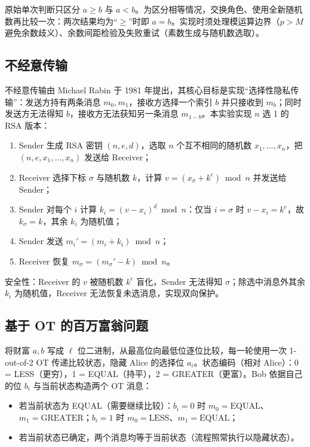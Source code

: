 \documentclass{SYSUReport}
\begin{document}
原始单次判断只区分 $a \ge b$ 与 $a < b$。为区分相等情况，交换角色、使用全新随机数再比较一次：两次结果均为“$\ge$”时即 $a = b$。实现时须处理模运算边界（$p > M$ 避免余数歧义）、余数间距检验及失败重试（素数生成与随机数选取）。

\subsection{不经意传输}

不经意传输由 Michael Rabin 于 1981 年提出，其核心目标是实现“选择性隐私传输”：发送方持有两条消息 $m_0, m_1$，接收方选择一个索引 $b$ 并只接收到 $m_b$；同时发送方无法得知 $b$，接收方无法获知另一条消息 $m_{1-b}$。本实验实现 $n$ 选 1 的 RSA 版本：

\begin{enumerate}
    \item Sender 生成 RSA 密钥 $(n, e, d)$，选取 $n$ 个互不相同的随机数 $x_1, \ldots, x_n$，把 $(n, e, x_1, \ldots, x_n)$ 发送给 Receiver；
    \item Receiver 选择下标 $\sigma$ 与随机数 $k$，计算 $v = (x_\sigma + k^e) \bmod n$ 并发送给 Sender；
    \item Sender 对每个 $i$ 计算 $k_i = (v - x_i)^d \bmod n$：仅当 $i = \sigma$ 时 $v - x_i = k^e$，故 $k_\sigma = k$，其余 $k_i$ 为随机值；
    \item Sender 发送 $m_i' = (m_i + k_i) \bmod n$；
    \item Receiver 恢复 $m_\sigma = (m_\sigma' - k) \bmod n$。
\end{enumerate}

安全性：Receiver 的 $v$ 被随机数 $k^e$ 盲化，Sender 无法得知 $\sigma$；除选中消息外其余 $k_i$ 为随机值，Receiver 无法恢复未选消息，实现双向保护。

\subsection{基于 OT 的百万富翁问题}

将财富 $a, b$ 写成 $\ell$ 位二进制，从最高位向最低位逐位比较，每一轮使用一次 1-out-of-2 OT 传递比较状态，隐藏 Alice 的选择位 $a_i$。状态编码（相对 Alice）：0 = LESS（更穷），1 = EQUAL（持平），2 = GREATER（更富）。Bob 依据自己的位 $b_i$ 与当前状态构造两个 OT 消息：

\begin{itemize}
    \item 若当前状态为 EQUAL（需要继续比较）：$b_i = 0$ 时 $m_0 = \text{EQUAL}$、$m_1 = \text{GREATER}$；$b_i = 1$ 时 $m_0 = \text{LESS}$、$m_1 = \text{EQUAL}$；
    \item 若当前状态已确定，两个消息均等于当前状态（流程照常执行以隐藏状态）。
\end{itemize}
\end{document}

